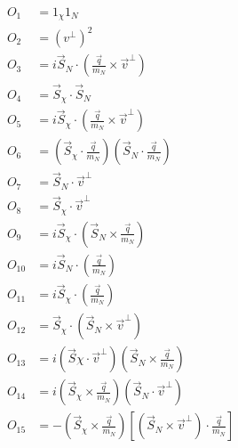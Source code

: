 \begin{equation} \label{eq:OpDef}
\begin{split}
O_1 &= 1_{\chi} 1_N  \\
O_2 &= (v^{\perp})^2 \\
O_3 &= i\vec{S}_N\cdot (\frac{\vec{q}}{m_N}\times\vec{v}^\perp) \\
O_4 &= \vec{S}_{\chi}\cdot \vec{S}_N \\
O_5 &= i\vec{S}_{\chi}\cdot (\frac{\vec{q}}{m_N}\times\vec{v}^\perp) \\O_6 &= (\vec{S}_{\chi} \cdot \frac{\vec{q}}{m_N})(\vec{S}_N \cdot \frac{\vec{q}}{m_N}) \\
O_7 &= \vec{S}_N \cdot \vec{v}^\perp \\
O_8 &= \vec{S}_{\chi} \cdot \vec{v}^\perp \\
O_9 &= i\vec{S}_{\chi} \cdot(\vec{S}_N \times \frac{\vec{q}}{m_N}) \\
O_{10} &= i\vec{S}_N \cdot (\frac{\vec{q}}{m_N}) \\
O_{11} &= i\vec{S}_{\chi} \cdot (\frac{\vec{q}}{m_N}) \\
O_{12} &= \vec{S}_\chi \cdot (\vec{S}_N \times \vec{v}^\perp) \\
O_{13} &= i(\vec{S}\chi \cdot \vec{v}^\perp)(\vec{S}_N \times \frac{\vec{q}}{m_N})\\
O_{14} &= i(\vec{S}_\chi \times \frac{\vec{q}}{m_N})(\vec{S}_N \cdot \vec{v}^\perp) \\
O_{15} &= -(\vec{S}_\chi \times \frac{\vec{q}}{m_N})[(\vec{S}_N \times \vec{v}^\perp)\cdot \frac{\vec{q}}{m_N}]
\end{split}
\end{equation}
	        	       
